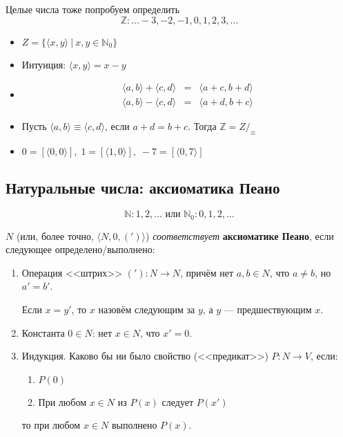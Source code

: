 Целые числа тоже попробуем определить
 $$\mathbb{Z}: \dots -3, -2, -1, 0, 1, 2, 3, \dots$$
\begin{itemize}
\item     $Z = \{\langle x, y \rangle\ |\ x,y\in \mathbb{N}_0\}$ 
\item Интуиция: $\langle x,y\rangle = x-y$
\item $$\begin{array}{rcl}
      \langle a, b \rangle + \langle c, d \rangle & = & \langle a + c, b + d \rangle \\
      \langle a, b \rangle - \langle c, d \rangle & = & \langle a + d, b + c \rangle 
  \end{array}$$
\item     Пусть $\langle a, b \rangle \equiv \langle c,d\rangle$, если $a + d = b + c$. Тогда $\mathbb{Z} = Z/_\equiv$
\item      $0 = [\langle 0,0 \rangle],\; 1 = [\langle 1,0\rangle],\; -7 = [\langle 0,7 \rangle]$

\end{itemize}

\subsection{Натуральные числа: аксиоматика Пеано}
 $$\mathbb{N}: 1, 2, \dots \mbox{ или } \mathbb{N}_0: 0, 1, 2, \dots$$

  $N$ (или, более точно, $\langle N, 0, (')\rangle$) \emph{соответствует} \textbf{аксиоматике Пеано}, 
  если следующее определено/выполнено:
  \begin{enumerate}
     \item Операция <<штрих>> $('): N \to N$, причём нет $a,b \in N$, что $a \ne b$, но $a' = b'$.
           
           Если $x = y'$, то $x$ назовём следующим за $y$, а $y$ --- предшествующим $x$.
     \item Константа $0 \in N$: нет $x \in N$, что $x' = 0$.
     \item Индукция. Каково бы ни было свойство (<<предикат>>) $P: N \to V$, если:
           \begin{enumerate}
           \item $P(0)$
           \item При любом $x\in N$ из $P(x)$ следует $P(x')$
           \end{enumerate}
           то при любом $x \in N$ выполнено $P(x)$.
  \end{enumerate}

